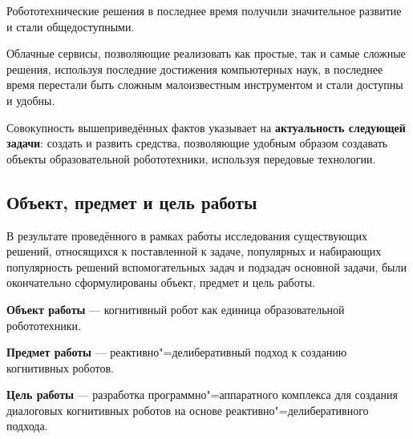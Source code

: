 Робототехнические решения в последнее время получили значительное развитие и стали общедоступными.

Облачные сервисы, позволяющие реализовать как простые, так и самые сложные решения, используя последние достижения компьютерных наук, в последнее время перестали быть сложным малоизвестным инструментом и стали доступны и удобны.

Совокупность вышеприведённых фактов указывает на \textbf{актуальность следующей задачи}: создать и развить средства, позволяющие удобным образом создавать объекты образовательной робототехники, используя передовые технологии.

\subsection{Объект, предмет и цель работы}

В результате проведённого в рамках работы исследования существующих решений, относящихся к поставленной к задаче, популярных и набирающих популярность решений вспомогательных задач и подзадач основной задачи, были окончательно сформулированы объект, предмет и цель работы.

\textbf{Объект работы} --- когнитивный робот как единица образовательной робототехники.

\textbf{Предмет работы} --- реактивно"=делиберативный подход к созданию когнитивных роботов.

\textbf{Цель работы} --- разработка программно"=аппаратного комплекса для создания диалоговых когнитивных роботов на основе реактивно"=делиберативного подхода.